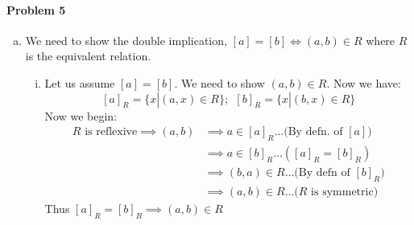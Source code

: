 \documentclass[12pt]{scrartcl}
\begin{document}
\paragraph*{Problem 5}
    \begin{enumerate}[a.]
        \item We need to show the double implication, $[a] = [b] \iff (a,b) \in R$ where $R$ is the equivalent relation. 
        \begin{enumerate}[i.]
            \item Let us assume $[a] = [b]$. We need to show $(a,b) \in R$. Now we have: 
            \[
                [a]_R = \{x | (a, x) \in R\}; \ \  [b]_R = \{x | (b, x) \in R\}
            \]
            Now we begin: 
            \begin{align*}
                R \text{ is reflexive} \implies (a, b) &\implies a \in [a]_R \ldots\text{(By defn. of $[a]$)} \\
                &\implies a \in [b]_R\ldots([a]_R = [b]_R) \\
                &\implies (b, a) \in R \ldots\text{(By defn of $[b]_R$)} \\
                &\implies (a, b) \in R \ldots \text{($R$ is symmetric)}
            \end{align*} 
            Thus $[a]_R = [b]_R \implies (a, b) \in R$
            

\end{enumerate}
\end{enumerate}
\end{document}
